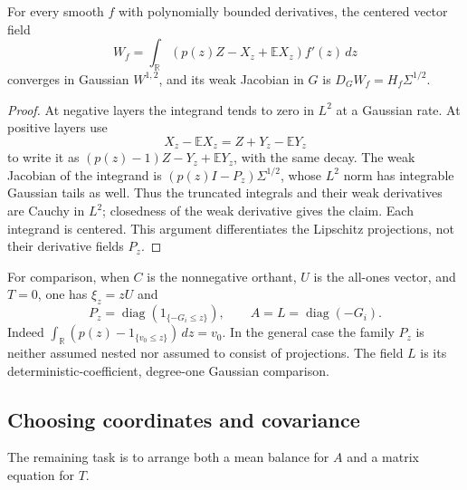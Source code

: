 \begin{lemma}\label{lem:projection-sobolev}
For every smooth \(f\) with polynomially bounded derivatives, the centered vector field
\[
W_f=\int_{\mathbb R}(p(z)Z-X_z+\mathbb EX_z)f'(z)\,dz
\]
converges in Gaussian \(W^{1,2}\), and its weak Jacobian in \(G\) is
\(D_GW_f=H_f\Sigma^{1/2}\).
\end{lemma}
\begin{proof}
At negative layers the integrand tends to zero in \(L^2\) at a Gaussian rate. At positive layers use
\[
X_z-\mathbb EX_z=Z+Y_z-\mathbb EY_z
\]
to write it as \((p(z)-1)Z-Y_z+\mathbb EY_z\), with the same decay. The weak Jacobian of the integrand is \((p(z)I-P_z)\Sigma^{1/2}\), whose \(L^2\) norm has integrable Gaussian tails as well. Thus the truncated integrals and their weak derivatives are Cauchy in \(L^2\); closedness of the weak derivative gives the claim. Each integrand is centered. This argument differentiates the Lipschitz projections, not their derivative fields \(P_z\).
\end{proof}

For comparison, when \(C\) is the nonnegative orthant, \(U\) is the all-ones vector, and \(T=0\), one has \(\xi_z=zU\) and
\[
P_z=\operatorname{diag}(1_{\{-G_i\le z\}}),\qquad
A=L=\operatorname{diag}(-G_i).
\]
Indeed \(\int_{\mathbb R}(p(z)-1_{\{v_0\le z\}})\,dz=v_0\). In the general case the family \(P_z\) is neither assumed nested nor assumed to consist of projections. The field \(L\) is its deterministic-coefficient, degree-one Gaussian comparison.

\subsection{Choosing coordinates and covariance}
The remaining task is to arrange both a mean balance for \(A\) and a matrix equation for \(T\).

